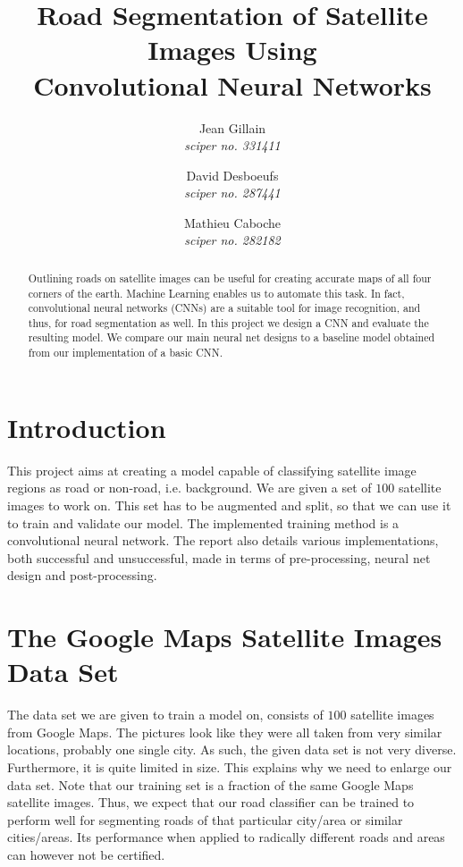 \documentclass[10pt,conference,compsocconf]{IEEEtran}
\begin{document}
\title{Road Segmentation of Satellite Images Using \\ Convolutional Neural Networks}

\author{
	Jean Gillain\\
	\textit{sciper no. 331411}
	\and
	 David Desboeufs\\
	 \textit{sciper no. 287441}
	 \and 
	 Mathieu Caboche\\
	 \textit{sciper no. 282182}
}

\maketitle

\begin{abstract}
	Outlining roads on satellite images can be useful for creating accurate maps of all four corners of the earth. Machine Learning enables us to automate this task. In fact, convolutional neural networks (CNNs) are a suitable tool for image recognition, and thus, for road segmentation as well. In this project we design a CNN and evaluate the resulting model. We compare our main neural net designs to a baseline model obtained from our implementation of a basic CNN.
	
\end{abstract}

\section{Introduction}

This project aims at creating a model capable of classifying satellite image regions as road or non-road, i.e. background. We are given a set of $100$ satellite images to work on. This set has to be augmented and split, so that we can use it to train and validate our model. The implemented training method is a convolutional neural network. The report also details various implementations, both successful and unsuccessful, made in terms of pre-processing, neural net design and post-processing.


\section{The Google Maps Satellite Images Data Set}
\label{sec:dataset}
The data set we are given to train a model on, consists of $100$ satellite images from Google Maps. The pictures look like they were all taken from very similar locations, probably one single city. As such, the given data set is not very diverse. Furthermore, it is quite limited in size. This explains why we need to enlarge our data set. Note that our training set is a fraction of the same Google Maps satellite images. Thus, we expect that our road classifier can be trained to perform well for segmenting roads of that particular city/area or similar cities/areas. Its performance when applied to radically different roads and areas can however not be certified.
\end{document}
